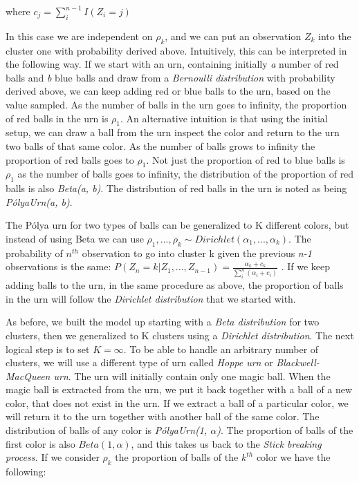 \documentclass[12pt,a4paper]{article}
\begin{document}
where $c_{j} = \sum_{i}^{n-1}I(Z_{i} = j)$

In this case we are independent on $\rho_{k}$, and we can put an observation $Z_{k}$ into the cluster one with probability derived above. Intuitively, this can be interpreted in the following way. If we start with an urn, containing initially \textit{a} number of red balls and \textit{b} blue balls and draw from a \textit{Bernoulli distribution} with probability derived above, we can keep adding red or blue balls to the urn, based on the value sampled. As the number of balls in the urn goes to infinity, the proportion of red balls in the urn is $\rho_{1}$. An alternative intuition is that using the initial setup, we can draw a ball from the urn inspect the color and return to the urn two balls of that same color. As the number of balls grows to infinity the proportion of red balls goes to $\rho_{1}$. Not just the proportion of red to blue balls is $\rho_{1}$ as the number of balls goes to infinity, the distribution of the proportion of red balls is also \textit{Beta(a, b)}. The distribution of red balls in the urn is noted as being \textit{PólyaUrn(a, b)}.

The Pólya urn for two types of balls can be generalized to K different colors, but instead of using Beta we can use $\rho_{1}, ..., \rho_{k} \sim Dirichlet(\alpha_{1}, ..., \alpha_{k})$. The probability of $n^{th}$ observation to go into cluster k given the previous \textit{n-1} observations is the same:
$P(Z_{n} = k|Z_{1}, ..., Z_{n-1}) = \frac{\alpha_{k} + c_{k}}{\sum_i^n (\alpha_{i} + c_{i})}$ . If we keep adding balls to the urn, in the same procedure as above, the proportion of balls in the urn will follow the \textit{Dirichlet distribution} that we started with. 

As before, we built the model up starting with a \textit{Beta distribution} for two clusters, then we generalized to K clusters using a \textit{Dirichlet distribution}. The next logical step is to set $K=\infty$. To be able to handle an arbitrary number of clusters, we will use a different type of urn called \textit{Hoppe urn} or \textit{Blackwell-MacQueen urn}. The urn will initially contain only one magic ball. When the magic ball is extracted from the urn, we put it back together with a ball of a new color, that does not exist in the urn. If we extract a ball of a particular color, we will return it to the urn together with another ball of the same color. The distribution of balls of any color is \textit{PólyaUrn(1, $\alpha$)}. The proportion of balls of the first color is also $Beta(1, \alpha)$, and this takes us back to the \textit{Stick breaking process.} If we consider $\rho_{k}$ the proportion of balls of the $k^{th}$ color we have the following: 
\end{document}
